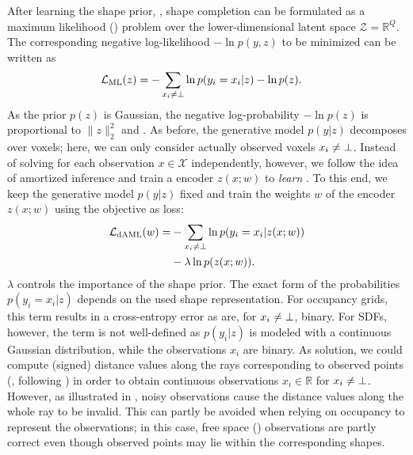 After learning the shape prior, , shape completion can be formulated as a maximum likelihood (\ML) problem  over the lower-dimensional latent space $\mathcal{Z} = \mathbb{R}^Q$. The corresponding negative log-likelihood $-\ln p(y, z)$ to be minimized can be written as
%
\begin{align}
\mathcal{L}_{\text{ML}}(z) &= - \sum_{x_i \neq \bot} \ln p(y_i = x_i | z) - \ln p(z).\label{eq:ml}
\end{align}
%
As the prior $p(z)$ is Gaussian, the negative log-probability $- \ln p(z)$ is proportional to $\|z\|_2^2$ and . As before, the generative model $p(y | z)$ decomposes over voxels; here, we can only consider actually observed voxels $x_i \neq \bot$.  Instead of solving  for each observation $x \in \mathcal{X}$ independently, however, we follow the idea of amortized inference \citep{Gersham2014COGSCI} and train a  encoder $z(x;w)$ to \emph{learn} \ML. To this end, we keep the generative model $p(y|z)$ fixed and train  the weights $w$ of the  encoder $z(x;w)$ using the \ML objective as loss:
%
\begin{align}
    \begin{split}
        \mathcal{L}_{\text{dAML}}(w) =& - \sum _{x_i \neq \bot} \ln p(y_i = x_i | z(x; w))\\
        &- \lambda \ln p(z(x; w)).\label{eq:aml}
    \end{split}
\end{align}
%
 $\lambda$ controls the importance of the shape prior. The exact form of the probabilities $p(y_i = x_i | z)$ depends on the used shape representation. For occupancy grids, this term results in a cross-entropy error as  are, for $x_i \neq \bot$, binary. For SDFs, however, the term is not well-defined as $p(y_i | z)$ is modeled with a continuous Gaussian distribution, while the observations $x_i$ are binary. As solution, we could compute (signed) distance values along the rays corresponding to observed points (\eg, following \citep{Steinbrucker2013ICCV}) in order to obtain continuous observations $x_i \in\mathbb{R}$ for $x_i \neq \bot$. However, as illustrated in , noisy observations cause the distance values along the whole ray to be invalid. This can partly be avoided when relying  on occupancy to represent the observations; in this case, free space (\cf {}) observations are partly correct even though observed points may lie within the corresponding shapes.

